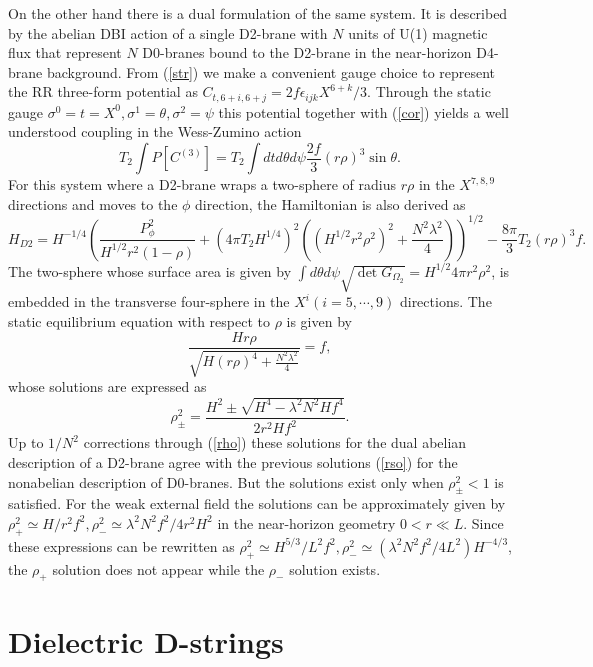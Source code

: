 \documentclass[12pt,a4paper]{article}
\newcommand{\la}{\lambda}
\begin{document}
On the other hand there is a dual formulation of the same system. 
It is described by the abelian DBI action of a single D2-brane with $N$ 
units of U(1) magnetic flux that represent $N$ D0-branes bound to the
D2-brane in the near-horizon D4-brane background.
From (\ref{str}) we make a convenient gauge choice to represent the RR
three-form potential as $C_{t,6+i,6+j} = 2f\epsilon_{ijk}X^{6+k}/3$.
Through the static gauge $\sigma^0 = t = X^0, \sigma^1 =\theta, 
\sigma^2 = \psi$ this potential together with (\ref{cor}) yields 
a well understood coupling in the Wess-Zumino action
\begin{equation} 
T_2\int P[C^{(3)}] = T_2 \int dtd\theta d\psi \frac{2f}{3}(r\rho)^3
\sin \theta.
\end{equation}
For this system where a D2-brane wraps a two-sphere of radius $r\rho$ in
the $X^{7,8,9}$ directions and moves to the $\phi$ direction, the 
Hamiltonian is also derived as 
\begin{equation}
H_{D2} = H^{-1/4}\left( \frac{P^2_{\phi}}{H^{1/2}r^2(1-\rho)} + 
(4\pi T_2H^{1/4})^2( (H^{1/2}r^2\rho^2)^2 + \frac{N^2\la^2}{4})
\right)^{1/2} - \frac{8\pi}{3} T_2 (r\rho)^3f.
\end{equation}
The two-sphere whose surface area is given by $\int d\theta 
d\psi \sqrt{\det G_{\Omega_2}}=H^{1/2}4\pi r^2\rho^2$,  
is embedded in the transverse four-sphere in 
the $X^i (i=5,\cdots,9)$ directions. The static equilibrium equation 
with respect to $\rho$ is given by
\begin{equation}
\frac{Hr\rho}{\sqrt{H(r\rho)^4 + \frac{N^2\la^2}{4}}} = f,
\end{equation}
whose solutions are expressed as 
\begin{equation}
\rho^2_{\pm} = \frac{H^2 \pm \sqrt{H^4 - \la^2N^2Hf^4}}{2r^2Hf^2}.
\end{equation}
Up to $1/N^2$ corrections through (\ref{rho}) these solutions for the
dual abelian description of a D2-brane agree with the previous solutions
(\ref{rso}) for the nonabelian description of D0-branes.
But the solutions exist only when $\rho^2_{\pm} < 1$ is satisfied.
For the weak external field the solutions can be approximately given by
$\rho^2_+ \simeq H/r^2f^2, \rho^2_- \simeq \la^2N^2f^2/4r^2H^2$ in
the near-horizon geometry $0<r \ll L$. Since these expressions can be
rewritten as $\rho^2_+ \simeq H^{5/3}/L^2f^2, \rho^2_- \simeq
(\la^2N^2f^2/4L^2)H^{-4/3}$, the $\rho_+$ solution does not appear while
the $\rho_-$ solution exists. 

\section{Dielectric D-strings}
\end{document}
